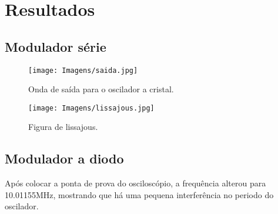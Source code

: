 \newpage
\section{Resultados}

\subsection{Modulador série}

\begin{figure}[H]
	\centering
	\texttt{[image: Imagens/saida.jpg]}
	\caption{Onda de saída para o oscilador a cristal.}
	\label{f_saida}
\end{figure}

\begin{figure}[H]
	\centering
	\texttt{[image: Imagens/lissajous.jpg]}
	\caption{Figura de lissajous.}
	\label{f_lissajous}
\end{figure}


\subsection{Modulador a diodo}
Após colocar a ponta de prova do osciloscópio, a frequência alterou para 10.01155MHz, mostrando que há uma pequena interferência no periodo do oscilador.